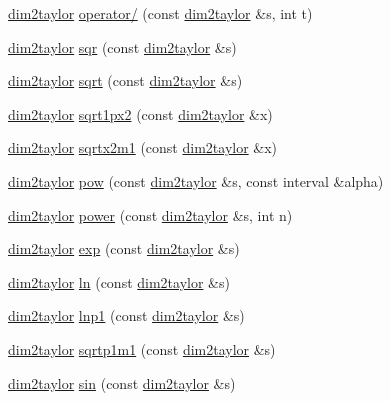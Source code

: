 \begin{DoxyCompactItemize}
\item 
\hyperlink{classtaylor_1_1dim2taylor}{dim2taylor} \hyperlink{namespacetaylor_afed918a308085255f702c43ce94eb87d}{operator/} (const \hyperlink{classtaylor_1_1dim2taylor}{dim2taylor} \&s, int t)
\item 
\hyperlink{classtaylor_1_1dim2taylor}{dim2taylor} \hyperlink{namespacetaylor_ad814819d656f5760e836bfa130f1d3a4}{sqr} (const \hyperlink{classtaylor_1_1dim2taylor}{dim2taylor} \&s)
\item 
\hyperlink{classtaylor_1_1dim2taylor}{dim2taylor} \hyperlink{namespacetaylor_af90786d46d07cc1e02c6011fee55f165}{sqrt} (const \hyperlink{classtaylor_1_1dim2taylor}{dim2taylor} \&s)
\item 
\hyperlink{classtaylor_1_1dim2taylor}{dim2taylor} \hyperlink{namespacetaylor_a269ca1cb03661bb2b2649b5de7cfb2fe}{sqrt1px2} (const \hyperlink{classtaylor_1_1dim2taylor}{dim2taylor} \&x)
\item 
\hyperlink{classtaylor_1_1dim2taylor}{dim2taylor} \hyperlink{namespacetaylor_adb8c00fba0cd105428efb20583e3eb57}{sqrtx2m1} (const \hyperlink{classtaylor_1_1dim2taylor}{dim2taylor} \&x)
\item 
\hyperlink{classtaylor_1_1dim2taylor}{dim2taylor} \hyperlink{namespacetaylor_a769606a4634cc75e25da1a652cf19b14}{pow} (const \hyperlink{classtaylor_1_1dim2taylor}{dim2taylor} \&s, const interval \&alpha)
\item 
\hyperlink{classtaylor_1_1dim2taylor}{dim2taylor} \hyperlink{namespacetaylor_a09dab31240298a683a7912d43938e0bb}{power} (const \hyperlink{classtaylor_1_1dim2taylor}{dim2taylor} \&s, int n)
\item 
\hyperlink{classtaylor_1_1dim2taylor}{dim2taylor} \hyperlink{namespacetaylor_a478ad7631859d3793d8fc867cbd813d6}{exp} (const \hyperlink{classtaylor_1_1dim2taylor}{dim2taylor} \&s)
\item 
\hyperlink{classtaylor_1_1dim2taylor}{dim2taylor} \hyperlink{namespacetaylor_a41b79fca8d7b9a92dee56066fe632560}{ln} (const \hyperlink{classtaylor_1_1dim2taylor}{dim2taylor} \&s)
\item 
\hyperlink{classtaylor_1_1dim2taylor}{dim2taylor} \hyperlink{namespacetaylor_a3f3028a96916fee45ecb547821e379e7}{lnp1} (const \hyperlink{classtaylor_1_1dim2taylor}{dim2taylor} \&s)
\item 
\hyperlink{classtaylor_1_1dim2taylor}{dim2taylor} \hyperlink{namespacetaylor_a4bc5f46fac7267d44a627cf61276e6c1}{sqrtp1m1} (const \hyperlink{classtaylor_1_1dim2taylor}{dim2taylor} \&s)
\item 
\hyperlink{classtaylor_1_1dim2taylor}{dim2taylor} \hyperlink{namespacetaylor_ae72c8b625cbb6c9d852c823755ea5299}{sin} (const \hyperlink{classtaylor_1_1dim2taylor}{dim2taylor} \&s)

\end{DoxyCompactItemize}
